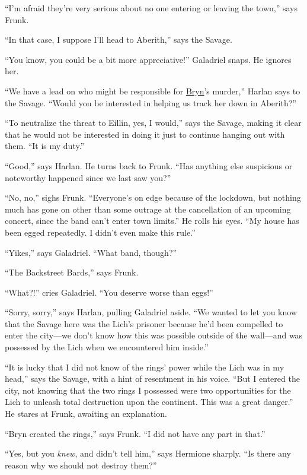 \documentclass[smalldemyvopaper,11pt,twoside,onecolumn,openright,extrafontsizes]{memoir}
\begin{document}
``I'm afraid they're very serious about no one entering or leaving the
town,'' says Frunk.

``In that case, I suppose I'll head to Aberith,'' says the Savage.

``You know, you could be a bit more appreciative!'' Galadriel snaps. He
ignores her.

``We have a lead on who might be responsible for
\href{/characters/bryn/}{Bryn}'s murder,'' Harlan says to the Savage.
``Would you be interested in helping us track her down in Aberith?''

``To neutralize the threat to Eillin, yes, I would,'' says the Savage,
making it clear that he would not be interested in doing it just to
continue hanging out with them. ``It is my duty.''

``Good,'' says Harlan. He turns back to Frunk. ``Has anything else
suspicious or noteworthy happened since we last saw you?''

``No, no,'' sighs Frunk. ``Everyone's on edge because of the lockdown,
but nothing much has gone on other than some outrage at the cancellation
of an upcoming concert, since the band can't enter town limits.'' He
rolls his eyes. ``My house has been egged repeatedly. I didn't even make
this rule.''

``Yikes,'' says Galadriel. ``What band, though?''

``The Backstreet Bards,'' says Frunk.

``What?!'' cries Galadriel. ``You deserve worse than eggs!''

``Sorry, sorry,'' says Harlan, pulling Galadriel aside. ``We wanted to
let you know that the Savage here was the Lich's prisoner because he'd
been compelled to enter the city---we don't know how this was possible
outside of the wall---and was possessed by the Lich when we encountered
him inside.''

``It is lucky that I did not know of the rings' power while the Lich was
in my head,'' says the Savage, with a hint of resentment in his voice.
``But I entered the city, not knowing that the two rings I possessed
were two opportunities for the Lich to unleash total destruction upon
the continent. This was a great danger.'' He stares at Frunk, awaiting
an explanation.

``Bryn created the rings,'' says Frunk. ``I did not have any part in
that.''

``Yes, but you \emph{knew}, and didn't tell him,'' says Hermione
sharply. ``Is there any reason why we should not destroy them?''
\end{document}
